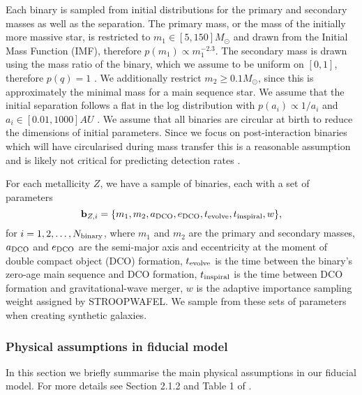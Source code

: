 Each binary is sampled from initial distributions for the primary and secondary masses as well as the separation. The primary mass, or the mass of the initially more massive star, is restricted to $m_1 \in [5, 150] \unit{M_{\odot}}$ and drawn from the \citet{Kroupa+2001} Initial Mass Function (IMF), therefore $p(m_1) \propto m_1^{-2.3}$. The secondary mass is drawn using the mass ratio of the binary, which we assume to be uniform on $[0, 1]$, therefore $p(q) = 1$ \citep[consistent e.g. with][]{Sana+2012}. We additionally restrict $m_2 \ge 0.1 \unit{M_{\odot}}$, since this is approximately the minimal mass for a main sequence star. We assume that the initial separation follows a flat in the log distribution with $p(a_i) \propto 1 / a_i$ and $a_i \in [0.01, 1000] \unit{AU}$ \citep{Opik+1924, Abt+1983}. We assume that all binaries are circular at birth to reduce the dimensions of initial parameters. Since we focus on post-interaction binaries which will have circularised during mass transfer this is a reasonable assumption and is likely not critical for predicting detection rates \citep{Hurley+2002, deMink+2015}.

For each metallicity $Z$, we have a sample of binaries, each with a set of parameters
\begin{equation}
    \mathbf{b}_{{Z, i}} = \{m_1, m_2, a_{\rm DCO}, e_{\rm DCO}, t_{\rm evolve}, t_{\rm inspiral}, w\},
\end{equation}
for $i = 1, 2, \dots, N_{\rm binary}$, where $m_1$ and $m_2$ are the primary and secondary masses, $a_{\rm DCO}$ and $e_{\rm DCO}$ are the semi-major axis and eccentricity at the moment of double compact object (DCO) formation, $t_{\rm evolve}$ is the time between the binary's zero-age main sequence and DCO formation, $t_{\rm inspiral}$ is the time between DCO formation and gravitational-wave merger, $w$ is the adaptive importance sampling weight assigned by STROOPWAFEL. We sample from these sets of parameters when creating synthetic galaxies.

\subsubsection{Physical assumptions in fiducial model}\label{sec:fiducial_physics}
In this section we briefly summarise the main physical assumptions in our fiducial model. For more details see Section 2.1.2 and Table 1 of \citet{Broekgaarden+2021}.

